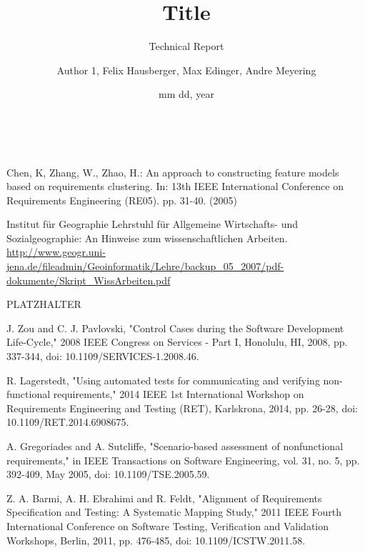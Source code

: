\documentclass[a4paper,10pt, bibliography=totocnumbered]{scrreprt}
\author{Author 1, Felix Hausberger, Max Edinger, Andre Meyering}
\title{Title }
\subtitle{Technical Report}
\date{mm dd, year}
\makeatletter
\renewcommand{\maketitle}{\begin{titlepage}
    \vskip 10\p@
    \hbox{
      \vrule depth 0.99\textheight
        \mbox{\hspace{2em}}
      \vtop{
        \vskip 10\p@
        \hspace{4pt}
        \vskip 50\p@
        \begin{flushleft}
          \Large \@author \par
        \end{flushleft}
        \vskip 50\p@
        \begin{flushleft}
          \huge \bfseries \@title \par
        \end{flushleft}
        \begin{flushleft}
          \Large \bfseries \@subtitle \par
        \end{flushleft}
        \vskip 70\p@
        \begin{flushleft}
          \Large \@publishers \par
        \end{flushleft}
        \vskip 50\p@
        \begin{flushleft}
          \Large \@date \par
        \end{flushleft}
        }}
  \end{titlepage}
}
\makeatother
\begin{document}
\maketitle



\tableofcontents









\begin{thebibliography}{9}

 Chen, K, Zhang, W., Zhao, H.: An approach to constructing feature models based on requirements clustering.
In: 13th IEEE International Conference on Requirements Engineering (RE05). pp. 31-40. (2005)

 Institut für Geographie   
Lehrstuhl für Allgemeine Wirtschafts- und Sozialgeographie: An Hinweise zum wissenschaftlichen Arbeiten.
\url{http://www.geogr.uni-jena.de/fileadmin/Geoinformatik/Lehre/backup_05_2007/pdf-dokumente/Skript_WissArbeiten.pdf}

 PLATZHALTER

 J. Zou and C. J. Pavlovski, "Control Cases during the Software Development Life-Cycle," 2008 IEEE Congress on Services - Part I, Honolulu, HI, 2008, pp. 337-344, doi: 10.1109/SERVICES-1.2008.46.

 R. Lagerstedt, "Using automated tests for communicating and verifying non-functional requirements," 2014 IEEE 1st International Workshop on Requirements Engineering and Testing (RET), Karlskrona, 2014, pp. 26-28, doi: 10.1109/RET.2014.6908675.

 A. Gregoriades and A. Sutcliffe, "Scenario-based assessment of nonfunctional requirements," in IEEE Transactions on Software Engineering, vol. 31, no. 5, pp. 392-409, May 2005, doi: 10.1109/TSE.2005.59.

 Z. A. Barmi, A. H. Ebrahimi and R. Feldt, "Alignment of Requirements Specification and Testing: A Systematic Mapping Study," 2011 IEEE Fourth International Conference on Software Testing, Verification and Validation Workshops, Berlin, 2011, pp. 476-485, doi: 10.1109/ICSTW.2011.58.

\end{thebibliography}

\listoffigures

\listoftables
\end{document}
